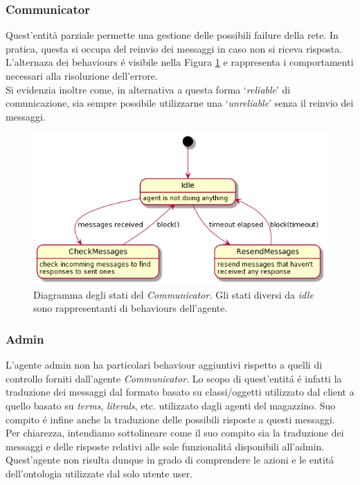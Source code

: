 \subsubsection{Communicator}
Quest'entità parziale permette una gestione delle possibili failure della rete. In pratica, questa si occupa del reinvio dei messaggi in caso non si riceva risposta.\\
L'alternaza dei behaviours \'e visibile nella Figura \ref{fig:communicator_state_diagrams} e rappresenta i comportamenti necessari alla risoluzione dell'errore.\\
Si evidenzia inoltre come, in alternativa a questa forma `\textit{reliable}' di comunicazione, sia sempre possibile utilizzarne una `\textit{unreliable}' senza il reinvio dei messaggi.
\begin{figure}[!ht]\centering
    \includegraphics[width=\textwidth]{section/design/figure/agent/communicator_states.png}
    \caption{Diagramma degli stati del \textit{Communicator.} Gli stati diversi da \textit{idle} sono rappresentanti di behaviours dell'agente.}
    \label{fig:communicator_state_diagrams}
\end{figure}

\subsubsection{Admin}
L'agente admin non ha particolari behaviour aggiuntivi rispetto a quelli di controllo forniti dall'agente \textit{Communicator}. Lo scopo di quest'entit\'a \'e infatti la traduzione dei messaggi dal formato basato su classi/oggetti utilizzato dal client a quello basato su \textit{terms}, \textit{literals}, etc. utilizzato dagli agenti del magazzino. Suo compito \'e infine anche la traduzione delle possibili risposte a questi messaggi.\\%
Per chiarezza, intendiamo sottolineare come il suo compito sia la traduzione dei messaggi e delle risposte relativi alle sole funzionalit\'a disponibili all'admin. Quest'agente non risulta dunque in grado di comprendere le azioni e le entit\'a dell'ontologia utilizzate dal solo utente user.

